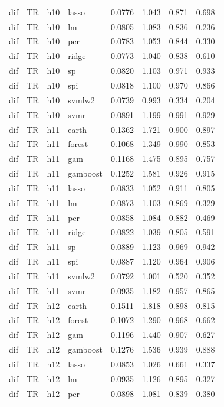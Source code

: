 \begin{ThreePartTable}
\begin{longtable}[t]{llclcccc}
dif & TR & h10 & lasso & 0.0776 & 1.043 & 0.871 & 0.698\\
dif & TR & h10 & lm & 0.0805 & 1.083 & 0.836 & 0.236\\
dif & TR & h10 & pcr & 0.0783 & 1.053 & 0.844 & 0.330\\
dif & TR & h10 & ridge & 0.0773 & 1.040 & 0.838 & 0.610\\
dif & TR & h10 & sp & 0.0820 & 1.103 & 0.971 & 0.933\\
dif & TR & h10 & spi & 0.0818 & 1.100 & 0.970 & 0.866\\
dif & TR & h10 & svmlw2 & 0.0739 & 0.993 & 0.334 & 0.204\\
dif & TR & h10 & svmr & 0.0891 & 1.199 & 0.991 & 0.929\\
\addlinespace
dif & TR & h11 & earth & 0.1362 & 1.721 & 0.900 & 0.897\\
dif & TR & h11 & forest & 0.1068 & 1.349 & 0.990 & 0.853\\
dif & TR & h11 & gam & 0.1168 & 1.475 & 0.895 & 0.757\\
dif & TR & h11 & gamboost & 0.1252 & 1.581 & 0.926 & 0.915\\
dif & TR & h11 & lasso & 0.0833 & 1.052 & 0.911 & 0.805\\
dif & TR & h11 & lm & 0.0873 & 1.103 & 0.869 & 0.329\\
dif & TR & h11 & pcr & 0.0858 & 1.084 & 0.882 & 0.469\\
dif & TR & h11 & ridge & 0.0822 & 1.039 & 0.805 & 0.591\\
dif & TR & h11 & sp & 0.0889 & 1.123 & 0.969 & 0.942\\
dif & TR & h11 & spi & 0.0887 & 1.120 & 0.964 & 0.906\\
dif & TR & h11 & svmlw2 & 0.0792 & 1.001 & 0.520 & 0.352\\
dif & TR & h11 & svmr & 0.0935 & 1.182 & 0.957 & 0.865\\
\addlinespace
dif & TR & h12 & earth & 0.1511 & 1.818 & 0.898 & 0.815\\
dif & TR & h12 & forest & 0.1072 & 1.290 & 0.968 & 0.662\\
dif & TR & h12 & gam & 0.1196 & 1.440 & 0.907 & 0.627\\
dif & TR & h12 & gamboost & 0.1276 & 1.536 & 0.939 & 0.888\\
dif & TR & h12 & lasso & 0.0853 & 1.026 & 0.661 & 0.337\\
dif & TR & h12 & lm & 0.0935 & 1.126 & 0.895 & 0.327\\
dif & TR & h12 & pcr & 0.0898 & 1.081 & 0.839 & 0.380\\

\end{longtable}
\end{ThreePartTable}

